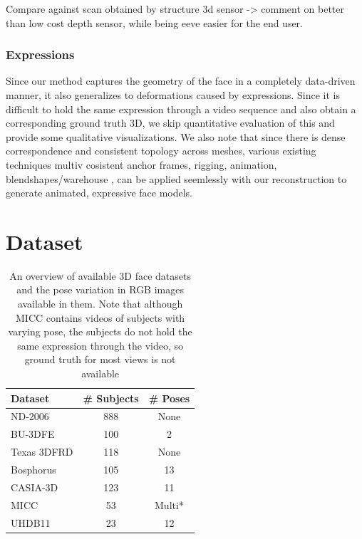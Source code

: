 \documentclass[10pt,twocolumn,letterpaper]{article}
\begin{document}
Compare against scan obtained by structure 3d sensor -> comment on better than low cost depth sensor, while being eeve easier for the end user.

\subsubsection{Expressions}
Since our method captures the geometry of the face in a completely data-driven manner, it also generalizes to deformations caused by expressions. 
Since it is difficult to hold the same expression through a video sequence and also obtain a corresponding ground truth 3D, we skip quantitative evaluation of this and provide some qualitative visualizations. 
We also note that since there is dense correspondence and consistent topology across meshes, various existing techniques \cite{} multiv cosistent anchor frames, rigging, animation, blendshapes/warehouse , can be applied seemlessly with our reconstruction to generate animated, expressive face models.




\section{Dataset}
\begin{table}
\begin{center}
\begin{tabular}{|l|c| c|}
\hline
Dataset & \# Subjects & \# Poses \\
\hline\hline
ND-2006 & 888 & None \\
BU-3DFE & 100 & 2 \\
Texas 3DFRD & 118 & None\\
Bosphorus & 105 & 13\\
CASIA-3D & 123 & 11\\
MICC & 53 & Multi*\\
UHDB11 & 23 & 12\\
\hline
\end{tabular}
\end{center}
\caption{An overview of available 3D face datasets and the pose variation in RGB images available in them. Note that although MICC contains videos of subjects with varying pose, the subjects do not hold the same expression through the video, so ground truth for most views is not available}
\end{table}
\end{document}
